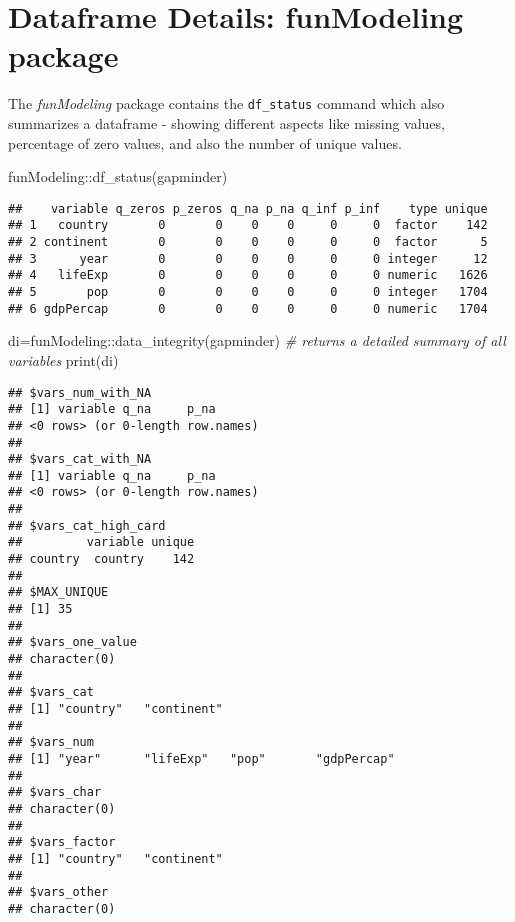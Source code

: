 \documentclass[
]{book}
\newenvironment{Shaded}{\begin{snugshade}}{\end{snugshade}}
\newcommand{\CommentTok}[1]{\textcolor[rgb]{0.56,0.35,0.01}{\textit{#1}}}
\newcommand{\FunctionTok}[1]{\textcolor[rgb]{0.00,0.00,0.00}{#1}}
\newcommand{\NormalTok}[1]{#1}
\newcommand{\OtherTok}[1]{\textcolor[rgb]{0.56,0.35,0.01}{#1}}
\newcommand{\SpecialCharTok}[1]{\textcolor[rgb]{0.00,0.00,0.00}{#1}}
\begin{document}
\hypertarget{dataframe-details-funmodeling-package}{%
\section{Dataframe Details: funModeling package}\label{dataframe-details-funmodeling-package}}

The \emph{funModeling} package contains the \texttt{df\_status} command which also summarizes
a dataframe - showing different aspects like missing values, percentage of zero
values, and also the number of unique values.

\begin{Shaded}
\begin{Highlighting}[]
\NormalTok{funModeling}\SpecialCharTok{::}\FunctionTok{df\_status}\NormalTok{(gapminder)}
\end{Highlighting}
\end{Shaded}

\begin{verbatim}
##    variable q_zeros p_zeros q_na p_na q_inf p_inf    type unique
## 1   country       0       0    0    0     0     0  factor    142
## 2 continent       0       0    0    0     0     0  factor      5
## 3      year       0       0    0    0     0     0 integer     12
## 4   lifeExp       0       0    0    0     0     0 numeric   1626
## 5       pop       0       0    0    0     0     0 integer   1704
## 6 gdpPercap       0       0    0    0     0     0 numeric   1704
\end{verbatim}

\begin{Shaded}
\begin{Highlighting}[]
\NormalTok{di}\OtherTok{=}\NormalTok{funModeling}\SpecialCharTok{::}\FunctionTok{data\_integrity}\NormalTok{(gapminder)}
\CommentTok{\# returns a detailed summary of all variables}
\FunctionTok{print}\NormalTok{(di)}
\end{Highlighting}
\end{Shaded}

\begin{verbatim}
## $vars_num_with_NA
## [1] variable q_na     p_na    
## <0 rows> (or 0-length row.names)
## 
## $vars_cat_with_NA
## [1] variable q_na     p_na    
## <0 rows> (or 0-length row.names)
## 
## $vars_cat_high_card
##         variable unique
## country  country    142
## 
## $MAX_UNIQUE
## [1] 35
## 
## $vars_one_value
## character(0)
## 
## $vars_cat
## [1] "country"   "continent"
## 
## $vars_num
## [1] "year"      "lifeExp"   "pop"       "gdpPercap"
## 
## $vars_char
## character(0)
## 
## $vars_factor
## [1] "country"   "continent"
## 
## $vars_other
## character(0)
\end{verbatim}
\end{document}
